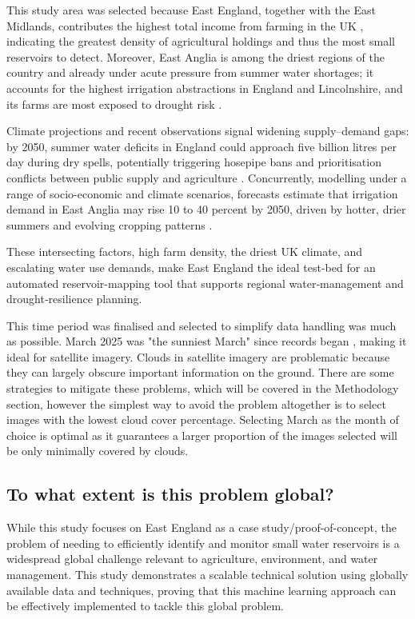 This study area was selected because East England, together with the East Midlands, contributes the highest total income from farming in the UK \citep{defra_2024}, indicating the greatest density of agricultural holdings and thus the most small reservoirs to detect. Moreover, East Anglia is among the driest regions of the country \citep{matthew_de-machen_mjr.global_2024} and already under acute pressure from summer water shortages; it accounts for the highest irrigation abstractions in England and Lincolnshire, and its farms are most exposed to drought risk \citep{ukia_2024, johns_2023}. 

Climate projections and recent observations signal widening supply–demand gaps: by 2050, summer water deficits in England could approach five billion litres per day during dry spells, potentially triggering hosepipe bans and prioritisation conflicts between public supply and agriculture \citep{horton_2024}. Concurrently, modelling under a range of socio-economic and climate scenarios, forecasts estimate that irrigation demand in East Anglia may rise 10 to 40 percent by 2050, driven by hotter, drier summers and evolving cropping patterns \citep{henriques_holman_audsley_pearn_2008, uk_ceh_2025}. 

These intersecting factors, high farm density, the driest UK climate, and escalating water use demands, make East England the ideal test-bed for an automated reservoir-mapping tool that supports regional water‐management and drought‐resilience planning.

This time period was finalised and selected to simplify data handling was much as possible. March 2025 was "the sunniest March" since records began \citep{pressoffice_2025_a}, making it ideal for satellite imagery. Clouds in satellite imagery are problematic because they can largely obscure important information on the ground. There are some strategies to mitigate these problems, which will be covered in the Methodology section, however the simplest way to avoid the problem altogether is to select images with the lowest cloud cover percentage. Selecting March as the month of choice is optimal as it guarantees a larger proportion of the images selected will be only minimally covered by clouds. 

\subsection{To what extent is this problem global?}
While this study focuses on East England as a case study/proof-of-concept, the problem of needing to efficiently identify and monitor small water reservoirs is a widespread global challenge relevant to agriculture, environment, and water management. This study demonstrates a scalable technical solution using globally available data and techniques, proving that this machine learning approach can be effectively implemented to tackle this global problem.

